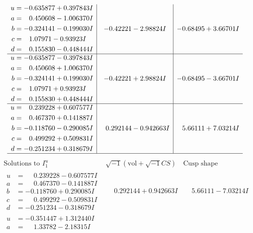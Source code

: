 \documentclass[1p]{elsarticle_modified}
\theoremstyle{definition}
\newcommand{\I}{\sqrt{-1}}
\begin{document}
$$\begin{array}{c|c|c}
\begin{aligned}
u &= -0.635877 + 0.397843 I \\
a &= \phantom{-}0.450608 - 1.006370 I \\
b &= -0.324141 - 0.199030 I \\
c &= \phantom{-}1.07971 - 0.93923 I \\
d &= \phantom{-}0.155830 - 0.448444 I\end{aligned}
 & -0.42221 - 2.98824 I & -0.68495 + 3.66701 I \\ \hline\begin{aligned}
u &= -0.635877 - 0.397843 I \\
a &= \phantom{-}0.450608 + 1.006370 I \\
b &= -0.324141 + 0.199030 I \\
c &= \phantom{-}1.07971 + 0.93923 I \\
d &= \phantom{-}0.155830 + 0.448444 I\end{aligned}
 & -0.42221 + 2.98824 I & -0.68495 - 3.66701 I \\ \hline\begin{aligned}
u &= \phantom{-}0.239228 + 0.607577 I \\
a &= \phantom{-}0.467370 + 0.141887 I \\
b &= -0.118760 - 0.290085 I \\
c &= \phantom{-}0.499292 + 0.509831 I \\
d &= -0.251234 + 0.318679 I\end{aligned}
 & \phantom{-}0.292144 - 0.942663 I & \phantom{-}5.66111 + 7.03214 I\\
 \hline 
 \end{array}$$\newpage$$\begin{array}{c|c|c}  
\text{Solutions to }I^u_{1}& \I (\text{vol} + \sqrt{-1}CS) & \text{Cusp shape}\\
 \hline 
\begin{aligned}
u &= \phantom{-}0.239228 - 0.607577 I \\
a &= \phantom{-}0.467370 - 0.141887 I \\
b &= -0.118760 + 0.290085 I \\
c &= \phantom{-}0.499292 - 0.509831 I \\
d &= -0.251234 - 0.318679 I\end{aligned}
 & \phantom{-}0.292144 + 0.942663 I & \phantom{-}5.66111 - 7.03214 I \\ \hline\begin{aligned}
u &= -0.351447 + 1.312440 I \\
a &= \phantom{-}1.33782 - 2.18315 I \\

\end{aligned}
\end{array}$$
\end{document}
